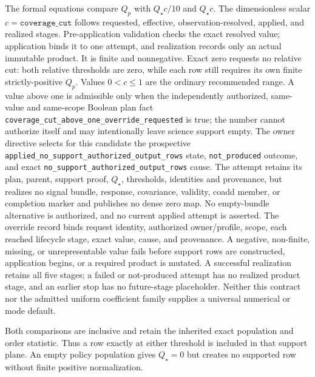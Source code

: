 \documentclass[10pt]{article}
\newcommand{\code}[1]{\nolinkurl{#1}}
\begin{document}
The formal equations compare \(Q_p\) with \(Q_\star c/10\) and \(Q_\star c\).
The dimensionless scalar \(c=\texttt{coverage\_cut}\) follows requested,
effective, observation-resolved, applied, and realized stages. Pre-application
validation checks the exact resolved value; application binds it to one
attempt, and realization records only an actual immutable product. It is finite
and nonnegative. Exact zero requests no relative cut: both relative thresholds are
zero, while each row still requires its own finite strictly-positive \(Q_p\).
Values \(0<c\le1\) are the ordinary recommended range. A value above one is
admissible only when the independently authorized, same-value and same-scope
Boolean plan fact \code{coverage_cut_above_one_override_requested} is true; the
number cannot authorize itself and may intentionally leave science support
empty. The owner directive selects for this candidate the prospective
\texttt{applied\_no\_support\_authorized\_output\_rows} state,
\texttt{not\_produced} outcome, and exact
\texttt{no\_support\_authorized\_output\_rows} cause. The attempt retains its
plan, parent, support proof, \(Q_\star\), thresholds, identities and provenance,
but realizes no signal bundle, response, covariance, validity, coadd member, or
completion marker and publishes no dense zero map. No empty-bundle alternative
is authorized, and no current applied attempt is asserted. The override record binds request identity, authorized owner/profile, scope,
each reached lifecycle stage, exact value, cause, and provenance. A negative,
non-finite, missing, or unrepresentable value fails before support rows are
constructed, application begins, or a required product is mutated. A successful
realization retains all five stages; a failed or not-produced attempt has no
realized product stage, and an earlier stop has no future-stage
placeholder. Neither this contract nor the admitted uniform
coefficient family supplies a universal numerical or mode default.

Both comparisons are inclusive and retain the inherited exact population and
order statistic. Thus a row exactly at either threshold is included in that
support plane. An empty policy population gives \(Q_\star=0\) but creates no
supported row without finite positive normalization.

\clearpage
\end{document}
